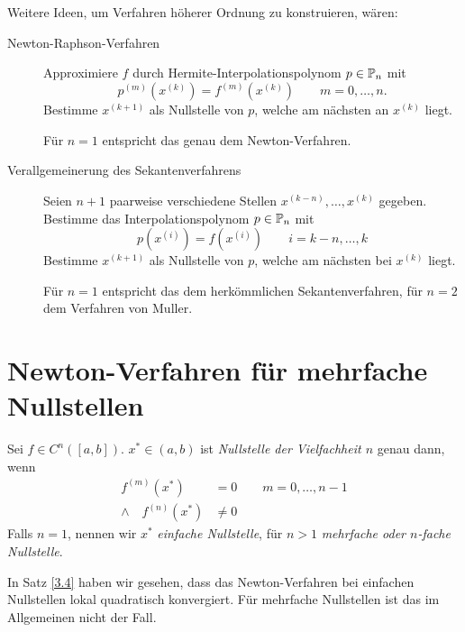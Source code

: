 \documentclass[
]{mycourse}
\begin{document}
Weitere Ideen, um Verfahren höherer Ordnung zu konstruieren, wären:
\begin{description}
	\item[Newton-Raphson-Verfahren]
		Approximiere $f$ durch Hermite-Interpolationspolynom $p\in \P_n$ mit 
		\[
			p^{(m)}(x^{(k)}) = f^{(m)}(x^{(k)}) \qquad m=0,\dotsc,n.
		\]
		Bestimme $x^{(k+1)}$ als Nullstelle von $p$, welche am nächsten an $x^{(k)}$ liegt.

		Für $n=1$ entspricht das genau dem Newton-Verfahren.
	\item[Verallgemeinerung des Sekantenverfahrens]
		Seien $n+1$ paarweise verschiedene Stellen $x^{(k-n)}, \dotsc, x^{(k)}$ gegeben.
		Bestimme das Interpolationspolynom $p\in \P_n$ mit
		\[
			p(x^{(i)}) = f(x^{(i)}) \qquad i=k-n,\dotsc,k
		\]
		Bestimme $x^{(k+1)}$ als Nullstelle von $p$, welche am nächsten bei $x^{(k)}$ liegt.

		Für $n=1$ entspricht das dem herkömmlichen Sekantenverfahren, für $n=2$ dem Verfahren von Muller.
\end{description}


\section{Newton-Verfahren für mehrfache Nullstellen}

\begin{df} \label{3.14}
	Sei $f\in C^n ([a,b])$.
	$x^* \in (a,b)$ ist \emph{Nullstelle der Vielfachheit $n$} genau dann, wenn
	\begin{align*}
		f^{(m)}(x^*) &= 0 \qquad m=0,\dotsc,n-1 \\
		\land\quad f^{(n)}(x^*) &\neq 0
	\end{align*}
	Falls $n=1$, nennen wir $x^*$ \emph{einfache Nullstelle}, für $n>1$ \emph{mehrfache oder $n$-fache Nullstelle}.
\end{df}

\begin{nt*}
	In Satz \ref{3.4} haben wir gesehen, dass das Newton-Verfahren bei einfachen Nullstellen lokal quadratisch konvergiert.
	Für mehrfache Nullstellen ist das im Allgemeinen nicht der Fall.
\end{nt*}
\end{document}
